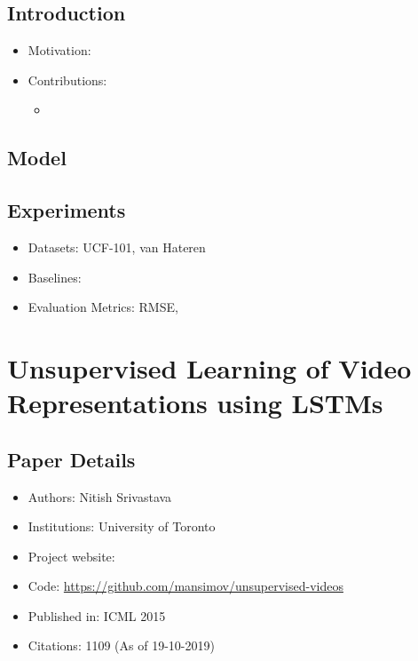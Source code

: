 \documentclass{article}
\begin{document}
    \subsection{Introduction}\label{subsec:Video_(Language)_Modeling_A_Baseline_for_Generative_Models_of_Natural_Videos:introduction}
    \begin{itemize}
        \item Motivation:
        \item Contributions:
        \begin{itemize}
            \item
        \end{itemize}
    \end{itemize}

    \subsection{Model}\label{subsec:Video_(Language)_Modeling_A_Baseline_for_Generative_Models_of_Natural_Videos:model}

    \subsection{Experiments}\label{subsec:Video_(Language)_Modeling_A_Baseline_for_Generative_Models_of_Natural_Videos:experiments}
    \begin{itemize}
        \item Datasets: UCF-101, van Hateren
        \item Baselines:
        \item Evaluation Metrics: RMSE,
    \end{itemize}
    \newpage


    \section{Unsupervised Learning of Video Representations using LSTMs}\label{sec:Unsupervised_Learning_of_Video_Representations_using_LSTMs}
    \subsection*{Paper Details}
    \begin{itemize}
        \item Authors: Nitish Srivastava
        \item Institutions: University of Toronto
        \item Project website:
        \item Code: \url{https://github.com/mansimov/unsupervised-videos}
        \item Published in: ICML 2015
        \item Citations: 1109 (As of 19-10-2019)
    \end{itemize}
\end{document}
